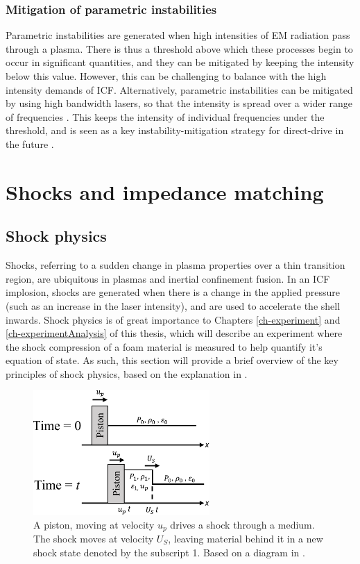 \subsubsection{Mitigation of parametric instabilities}
Parametric instabilities are generated when high intensities of EM radiation pass through a plasma. There is thus a threshold above which these processes begin to occur in significant quantities, and they can be mitigated by keeping the intensity below this value. However, this can be challenging to balance with the high intensity demands of ICF. Alternatively, parametric instabilities can be mitigated by using high bandwidth lasers, so that the intensity is spread over a wider range of frequencies \cite{Follett2018}. This keeps the intensity of individual frequencies under the threshold, and is seen as a key instability-mitigation strategy for direct-drive in the future \cite{Campbell2021a}.


\section{Shocks and impedance matching}

\subsection{Shock physics}

Shocks, referring to a sudden change in plasma properties over a thin transition region, are ubiquitous in plasmas and inertial confinement fusion. In an ICF implosion, shocks are generated when there is a change in the applied pressure (such as an increase in the laser intensity), and are used to accelerate the shell inwards. Shock physics is of great importance to Chapters \ref{ch-experiment} and \ref{ch-experimentAnalysis} of this thesis, which will describe an experiment where the shock compression of a foam material is measured to help quantify it's equation of state. As such, this section will provide a brief overview of the key principles of shock physics, based on the explanation in \cite{Zeldovich1966}.

\begin{figure}
\centering
\includegraphics[width=0.6\textwidth]{figures/Theory/Piston.pdf}%
\caption{\label{fig:Piston} A piston, moving at velocity $u_p$ drives a shock through a medium. The shock moves at velocity $U_S$, leaving material behind it in a new shock state denoted by the subscript 1. Based on a diagram in \cite{Zeldovich1966}.}
\end{figure}

